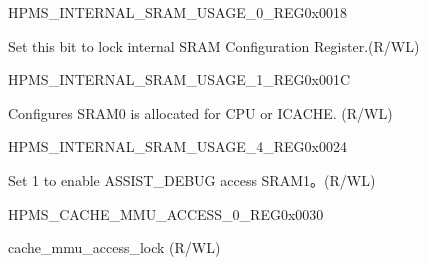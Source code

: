 \begin{register}{H}{PMS\_INTERNAL\_SRAM\_USAGE\_0\_REG}{0x0018}\label{regdesc:PMSINTERNALSRAMUSAGE0REG}
%
%
\regnewline%
\begin{regdesc}\begin{reglist}
\label{fielddesc:PMSINTERNALSRAMUSAGELOCK}\item [PMS\_INTERNAL\_SRAM\_USAGE\_LOCK] Set this bit to lock internal SRAM Configuration Register.(R/WL)
\end{reglist}\end{regdesc}
\end{register}


\begin{register}{H}{PMS\_INTERNAL\_SRAM\_USAGE\_1\_REG}{0x001C}\label{regdesc:PMSINTERNALSRAMUSAGE1REG}
%
%
%
\regnewline%
\begin{regdesc}\begin{reglist}
\label{fielddesc:PMSINTERNALSRAMUSAGECPUCACHE}\item [PMS\_INTERNAL\_SRAM\_USAGE\_CPU\_CACHE] Configures SRAM0 is allocated for CPU or ICACHE. (R/WL)
\end{reglist}\end{regdesc}
\end{register}




\begin{register}{H}{PMS\_INTERNAL\_SRAM\_USAGE\_4\_REG}{0x0024}\label{regdesc:PMSINTERNALSRAMUSAGE4REG}
%
%
\regnewline%
\begin{regdesc}\begin{reglist}
\label{fielddesc:PMSINTERNALSRAMUSAGELOGSRAM}\item [PMS\_INTERNAL\_SRAM\_USAGE\_LOG\_SRAM] Set 1 to enable ASSIST\_DEBUG access SRAM1。(R/WL)
\end{reglist}\end{regdesc}
\end{register}






\begin{register}{H}{PMS\_CACHE\_MMU\_ACCESS\_0\_REG}{0x0030}\label{regdesc:PMSCACHEMMUACCESS0REG}
%
%
\regnewline%
\begin{regdesc}\begin{reglist}
\label{fielddesc:PMSCACHEMMUACCESSLOCK}\item [PMS\_CACHE\_MMU\_ACCESS\_LOCK] cache\_mmu\_access\_lock (R/WL)
\end{reglist}\end{regdesc}
\end{register}


